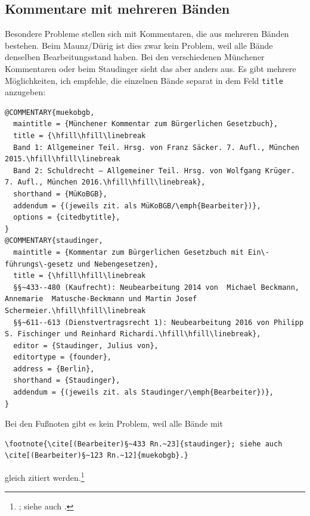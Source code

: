\documentclass[headings=small,numbers=noenddot, 12pt,oneside]{scrartcl}
\begin{document}
\subsection{Kommentare mit mehreren Bänden}
Besondere Probleme stellen sich mit Kommentaren, die aus mehreren Bänden bestehen. Beim Maunz/Dürig ist dies zwar kein Problem, weil alle Bände denselben Bearbeitungsstand haben. Bei den verschiedenen Münchener Kommentaren oder beim Staudinger sieht das aber anders aus. Es gibt mehrere Möglichkeiten, ich empfehle, die einzelnen Bände separat in dem Feld \texttt{title} anzugeben: 
\begin{verbatim}
@COMMENTARY{muekobgb,
  maintitle = {Münchener Kommentar zum Bürgerlichen Gesetzbuch},
  title = {\hfill\hfill\linebreak
  Band 1: Allgemeiner Teil. Hrsg. von Franz Säcker. 7. Aufl., München 2015.\hfill\hfill\linebreak
  Band 2: Schuldrecht – Allgemeiner Teil. Hrsg. von Wolfgang Krüger. 7. Aufl., München 2016.\hfill\hfill\linebreak},
  shorthand = {MüKoBGB},
  addendum = {(jeweils zit. als MüKoBGB/\emph{Bearbeiter})},
  options = {citedbytitle},
}
@COMMENTARY{staudinger,
  maintitle = {Kommentar zum Bürgerlichen Gesetzbuch mit Ein\-führungs\-gesetz und Nebengesetzen},
  title = {\hfill\hfill\linebreak
  §§~433--480 (Kaufrecht): Neubearbeitung 2014 von  Michael Beckmann, Annemarie  Matusche-Beckmann und Martin Josef Schermeier.\hfill\hfill\linebreak
  §§~611--613 (Dienstvertragsrecht 1): Neubearbeitung 2016 von Philipp S. Fischinger und Reinhard Richardi.\hfill\hfill\linebreak},
  editor = {Staudinger, Julius von},
  editortype = {founder},
  address = {Berlin},
  shorthand = {Staudinger},
  addendum = {(jeweils zit. als Staudinger/\emph{Bearbeiter})},
}
\end{verbatim}
Bei den Fußnoten gibt es kein Problem, weil alle Bände mit 
\begin{verbatim}
\footnote{\cite[(Bearbeiter)§~433 Rn.~23]{staudinger}; siehe auch \cite[(Bearbeiter)§~123 Rn.~12]{muekobgb}.}
\end{verbatim}
gleich zitiert werden.\footnote{\cite[(Bearbeiter)§~433 Rn.~23]{staudinger}; siehe auch \cite[(Bearbeiter)§~123 Rn.~12]{muekobgb}.} 
\end{document}
